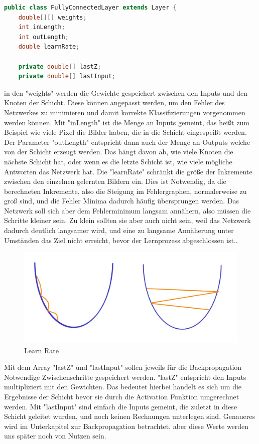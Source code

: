 \documentclass[12pt]{article}
\begin{document}
\begin{lstlisting}[language=Java]
public class FullyConnectedLayer extends Layer {
    double[][] weights;
    int inLength;
    int outLength;
    double learnRate;

    private double[] lastZ;
    private double[] lastInput;
\end{lstlisting} 
in den "weights" werden die Gewichte gespeichert zwischen den Inputs und den Knoten der Schicht. Diese können angepasst werden, um den Fehler des Netzwerkes zu minimieren und damit korrekte Klassifizierungen vorgenommen werden können.
Mit "inLength" ist die Menge an Inputs gemeint, das heißt zum Beispiel wie viele Pixel die Bilder haben, die in die Schicht eingespeißt werden.
Der Parameter "outLength" entspricht dann auch der Menge an Outputs welche von der Schicht erzeugt werden. Das hängt davon ab, wie viele Knoten die nächste Schicht hat, oder wenn es die letzte Schicht ist, wie viele mögliche Antworten das Netzwerk hat.
Die "learnRate" schränkt die größe der Inkremente zwischen den einzelnen gelernten Bildern ein. Dies ist Notwendig, da die berechneten Inkremente, also die Steigung im Fehlergraphen, normalerweise zu groß sind, und die Fehler Minima dadurch häufig übersprungen werden. Das Netzwerk soll sich aber dem Fehlerminimum langsam annähern, also müssen die Schritte kleiner sein. Zu klein sollten sie aber auch nicht sein, weil das Netzwerk dadurch deutlich langsamer wird, und eine zu langsame Annäherung unter Umständen das Ziel nicht erreicht, bevor der Lernprozess abgeschlossen ist..

\begin{figure}[H]
\centering
\includegraphics[scale=0.50]{./Images/BA_006_LearnRate.jpg}
\caption{Learn Rate}
\label{Learn Rate}
\end{figure}

Mit dem Array "lastZ" und "lastInput" sollen jeweils für die Backpropagation Notwendige Zwischenschritte gespeichert werden. "lastZ" entspricht den Inputs multipliziert mit den Gewichten. Das bedeutet hierbei handelt es sich um die Ergebnisse der Schicht bevor sie durch die Activation Funktion umgerechnet werden. Mit "lastInput" sind einfach die Inputs gemeint, die zuletzt in diese Schicht geleitet wurden, und noch keinen Rechnungen unterlegen sind. Genaueres wird im Unterkapitel zur Backpropagation betrachtet, aber diese Werte werden uns später noch von Nutzen sein.
\end{document}
